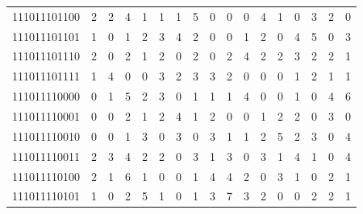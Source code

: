 \documentclass[10pt,a4paper]{article}
\begin{document}
\begin{longtable}{ |c|c|c|c|c|c|c|c|c|c|c|c|c|c|c|c|c| }
    111011101100              & 2                            & 2                                & 4                            & 1                              & 1   & 1   & 5   & 0   & 0   & 0   & 4   & 1   & 0   & 3   & 2   & 0   \\
    111011101101              & 1                            & 0                                & 1                            & 2                              & 3   & 4   & 2   & 0   & 0   & 1   & 2   & 0   & 4   & 5   & 0   & 3   \\
    111011101110              & 2                            & 0                                & 2                            & 1                              & 2   & 0   & 2   & 0   & 2   & 4   & 2   & 2   & 3   & 2   & 2   & 1   \\
    111011101111              & 1                            & 4                                & 0                            & 0                              & 3   & 2   & 3   & 3   & 2   & 0   & 0   & 0   & 1   & 2   & 1   & 1   \\
    111011110000              & 0                            & 1                                & 5                            & 2                              & 3   & 0   & 1   & 1   & 1   & 4   & 0   & 0   & 1   & 0   & 4   & 6   \\
    111011110001              & 0                            & 0                                & 2                            & 1                              & 2   & 4   & 1   & 2   & 0   & 0   & 1   & 2   & 2   & 0   & 3   & 0   \\
    111011110010              & 0                            & 0                                & 1                            & 3                              & 0   & 3   & 0   & 3   & 1   & 1   & 2   & 5   & 2   & 3   & 0   & 4   \\
    111011110011              & 2                            & 3                                & 4                            & 2                              & 2   & 0   & 3   & 1   & 3   & 0   & 3   & 1   & 4   & 1   & 0   & 4   \\
    111011110100              & 2                            & 1                                & 6                            & 1                              & 0   & 0   & 1   & 4   & 4   & 2   & 0   & 3   & 1   & 0   & 2   & 1   \\
    111011110101              & 1                            & 0                                & 2                            & 5                              & 1   & 0   & 1   & 3   & 7   & 3   & 2   & 0   & 0   & 2   & 2   & 1   \\

\end{longtable}
\end{document}
